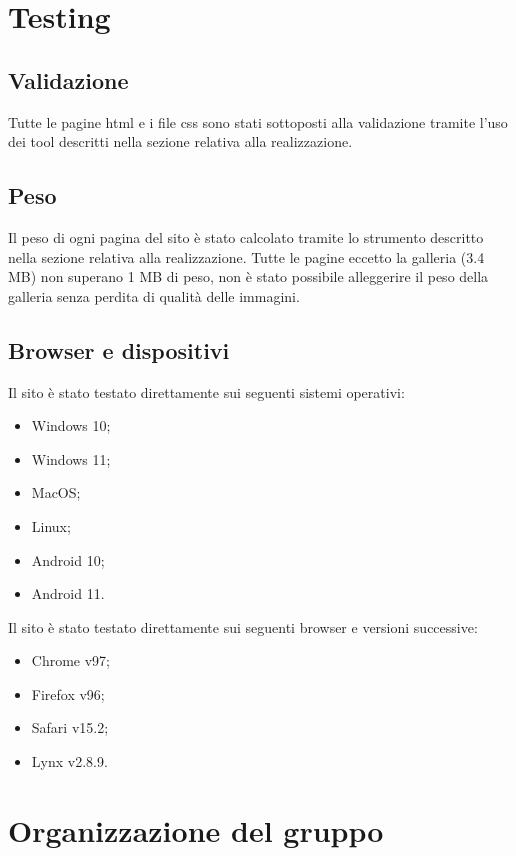 \documentclass{template}
\begin{document}
	\section{Testing}
	\subsection{Validazione}
	Tutte le pagine html e i file css sono stati sottoposti alla validazione tramite l'uso dei tool descritti nella sezione relativa alla realizzazione.
	
	\subsection{Peso}
	Il peso di ogni pagina del sito è stato calcolato tramite lo strumento descritto nella sezione relativa alla realizzazione. Tutte le pagine eccetto la galleria (3.4 MB) non superano 1 MB di peso, non è stato possibile alleggerire il peso della galleria senza perdita di qualità delle immagini.
	
	\subsection{Browser e dispositivi}

	Il sito è stato testato direttamente sui seguenti sistemi operativi:
	\begin{itemize}
		\item Windows 10;
		\item Windows 11;
		\item MacOS;
		\item Linux;
		\item Android 10;
		\item Android 11.
	\end{itemize}

	Il sito è stato testato direttamente sui seguenti browser e versioni successive:
	\begin{itemize}
		\item Chrome v97;
		\item Firefox v96;
		\item Safari v15.2;
		\item Lynx v2.8.9.
	\end{itemize}   

	\section{Organizzazione del gruppo}
\end{document}
